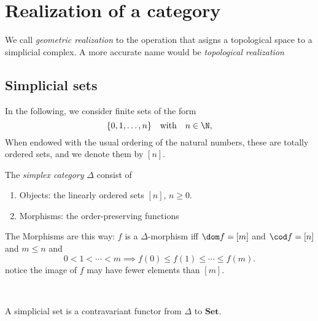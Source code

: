 \chapter{Realization of a category}

We call \textit{geometric realization} to the operation that asigns a topological space to a simplicial complex. A more accurate name would be \textit{topological realization}


\section{Simplicial sets}


In the following, we consider finite sets of the form \[\{0,1,\dots,n\}\quad\text{with}\quad n\in\N,\] 
When  endowed with the usual ordering of the natural numbers, these are totally ordered sets, and we denote them  by \([n]\). %


\begin{definition}
    The \textit{simplex category} \(\Delta\) consist of \begin{enumerate}[label=(\roman*)]
        \item Objects: the linearly ordered sets \([n]\), \(n\geq 0\).
        \item Morphisms: the order-preserving functions
    \end{enumerate}
\end{definition}

\begin{remark}
    The Morphisms are this way: \(f\) is a \(\Delta\)-morphism iff \(\dom f = [m]\)  and \(\cod f = [n]\) and \(m\leq n\) and \[
        0< 1 < \cdots < m \implies f(0) \leq f(1) \leq  \cdots \leq  f(m).
    \]
    notice the image of \(f\) may have fewer elements than \([m]\).

    \
\end{remark}


\begin{definition}
    A simplicial set is a contravariant functor from \(\Delta\) to \(\mathbf{Set}\).
    
\end{definition}


